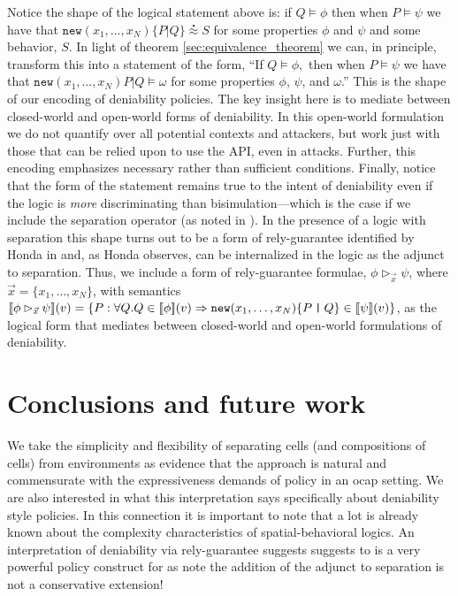 \documentclass[submission,copyright,creativecommons]{eptcs}
\newcommand{\ldb}{[\![}
\newcommand{\rdb}{]\!]}
\newcommand{\id}[1]{\texttt{#1}}
\newcommand{\juxtap}{\mathbin{\id{|}}}
\newcommand{\binpar}[2]{#1 \juxtap #2}
\newcommand{\pmeaningof}[1]{\ldb #1 \rdb}
\newcommand{\wbbisim}{\stackrel{\centerdot}{\approx}} %
\numberwithin{equation}{subsection}
\begin{document}
Notice the shape of the logical statement above is: if $Q \models
\phi$ then when $P \models \psi$ we have that
$\texttt{new}(x_1,\ldots,x_N)\{ \binpar{P}{Q} \} \wbbisim S$ for some
properties $\phi$ and $\psi$ and some behavior, $S$. In light of
theorem \ref{sec:equivalence_theorem} we can, in principle, transform
this into a statement of the form, ``If $Q \models \phi,$ then when $P
\models \psi$ we have that $\texttt{new}(x_1,\ldots,x_N)\binpar{P}{Q}
\models \omega$ for some properties $\phi$, $\psi$, and $\omega$.''
This is the shape of our encoding of deniability policies. The key
insight here is to mediate between closed-world and open-world forms
of deniability. In this open-world formulation we do not quantify over
all potential contexts and attackers, but work just with those that
can be relied upon to use the API, even in attacks. Further, this
encoding emphasizes necessary rather than sufficient
conditions. Finally, notice that the form of the statement remains
true to the intent of deniability even if the logic is \emph{more}
discriminating than bisimulation---which is the case if we include the
separation operator (as noted in
\cite{DBLP:conf/fossacs/Caires04}). In the presence of a logic with
separation this shape turns out to be a form of rely-guarantee
identified by Honda in \cite{Honda:2008:UTP:2227536.2227558} and, as
Honda observes, can be internalized in the logic as the adjunct to
separation. Thus, we include a form of rely-guarantee formulae, $\phi
\rhd_{\vec{x}} \psi$, where $\vec{x} = \{ x_1,\ldots,x_N\}$, with
semantics $\pmeaningof{\phi \rhd_{\vec{x}} \psi}( v ) = \{ P : \forall
Q. Q \in \pmeaningof{\phi}( v ) \Rightarrow
\mbox{\texttt{new}}(x_1,\ldots,x_N)\mbox{\{}\binpar{P}{Q}\mbox{\}}\in
\pmeaningof{\psi}(v) \}$, as the logical form that mediates between
closed-world and open-world formulations of deniability.

\section{Conclusions and future work}

We take the simplicity and flexibility of separating cells (and
compositions of cells) from environments as evidence that the approach
is natural and commensurate with the expressiveness demands of policy
in an ocap setting. We are also interested in what this interpretation
says specifically about deniability style policies. In this connection
it is important to note that a lot is already known about the
complexity characteristics of spatial-behavioral logics. An
interpretation of deniability via rely-guarantee suggests suggests to
is a very powerful policy construct for as
\cite{Caires04eliminationof} note the addition of the adjunct to
separation is not a conservative extension!
\end{document}
